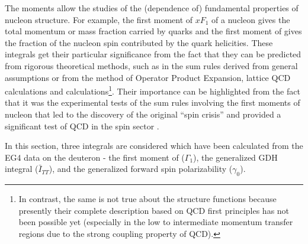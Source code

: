 The moments allow the studies of the (\qsqs dependence of) fundamental properties of nucleon %
structure. For example, the first moment of $x F_1$ %
of a nucleon gives the total momentum or mass fraction carried by quarks and the first moment of \gones gives the fraction of the nucleon spin contributed by the quark helicities. %
These integrals get their particular significance from the fact that they can be predicted from rigorous theoretical methods, such as in the sum rules derived from general assumptions or from the method of Operator Product Expansion, lattice QCD calculations and \chipts calculations\footnote{In contrast, the same is not true about the structure functions because presently their complete description %
based on QCD first principles %
has not been possible yet (especially in the low to intermediate momentum transfer regions due to the strong coupling property of QCD).}. %
Their importance can be highlighted from the fact that it was the experimental tests of the sum rules involving the first moments of nucleon that led to the discovery of the original ``spin crisis'' and provided a significant test of QCD in the spin sector  \cite{pLeaderKuhnChen}. %

In this section, three integrals are considered which have been calculated from the EG4 data on the deuteron - the first moment of \gones ($\Gamma_1$), the generalized GDH integral ($\bar{I}_{TT}$), and the generalized forward spin polarizability ($\gamma_0$). 

